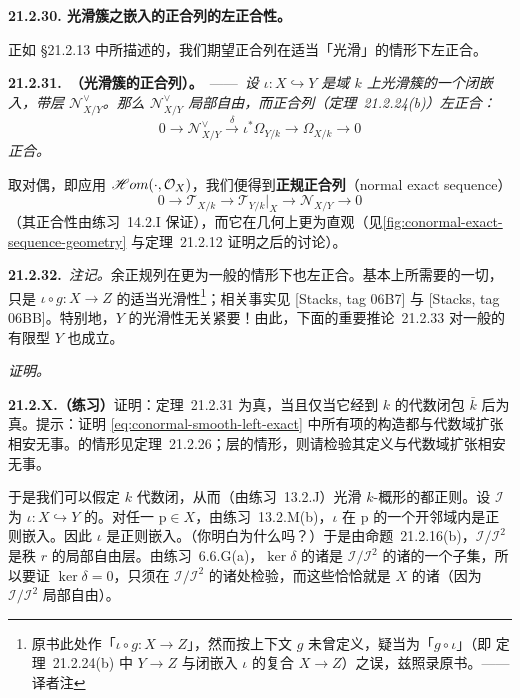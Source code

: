 \textbf{21.2.30. 光滑簇之嵌入的\trConormal{}正合列的左正合性。}

正如 \S21.2.13 中所描述的，我们期望\trConormal{}正合列在适当「光滑」的情形下左正合。

\textbf{21.2.31.\ \trhTheorem（光滑簇的\trConormal{}正合列）。}\ ——\ \emph{设 $\iota\colon X\hookrightarrow Y$ 是域 $k$ 上光滑簇的一个闭嵌入，带\trConormal{}层 $\mathscr{N}^{\vee}_{X/Y}$。那么 $\mathscr{N}^{\vee}_{X/Y}$ 局部自由，而\trConormal{}正合列（\mbox{定理~21.2.24(b)}）左正合：}
\begin{equation*}\tag{21.2.31.1}\label{eq:conormal-smooth-left-exact}
0\longrightarrow\mathscr{N}^{\vee}_{X/Y}\xrightarrow{\ \delta\ }\iota^*\Omega_{Y/k}\longrightarrow\Omega_{X/k}\longrightarrow 0
\end{equation*}
\emph{正合。}

取对偶，即应用 $\mathscr{H}om(\cdot,\mathcal{O}_X)$，我们便得到\textbf{正规正合列}（normal exact sequence）
\[
0\longrightarrow\mathscr{T}_{X/k}\longrightarrow\mathscr{T}_{Y/k}|_X\longrightarrow\mathscr{N}_{X/Y}\longrightarrow 0
\]
（其正合性由\mbox{练习~14.2.I} 保证），而它在几何上更为直观（见\cref{fig:conormal-exact-sequence-geometry} 与\mbox{定理~21.2.12} 证明之后的讨论）。

\textbf{21.2.32.}\ \emph{注记。}\quad 余正规列在更为一般的情形下也左正合。基本上所需要的一切，只是 $\iota\circ g\colon X\to Z$ 的适当光滑性\footnote{原书此处作「$\iota\circ g\colon X\to Z$」，然而按上下文 $g$ 未曾定义，疑当为「$g\circ\iota$」（即 \mbox{定理~21.2.24(b)} 中 $Y\to Z$ 与闭嵌入 $\iota$ 的复合 $X\to Z$）之误，兹照录原书。——译者注}；相关事实见 [Stacks, tag 06B7] 与 [Stacks, tag 06BB]。特别地，$Y$ 的光滑性无关紧要！由此，下面的\mbox{重要推论~21.2.33} 对一般的有限型 $Y$ 也成立。

\emph{证明。}

\textbf{21.2.X.（练习）}\quad 证明：\mbox{定理~21.2.31} 为真，当且仅当它经\trBaseChange{}到 $k$ 的代数闭包 $\bar{k}$ 后为真。提示：证明 \eqref{eq:conormal-smooth-left-exact} 中所有项的构造都与代数域扩张相安无事。\trDifferential{}的情形见\mbox{定理~21.2.26}；\trConormal{}层的情形，则请检验其定义与代数域扩张相安无事。

于是我们可以假定 $k$ 代数闭，从而（由\mbox{练习~13.2.J}）光滑 $k$-概形的\trClosedPoint{}都正则。设 $\mathscr{I}$ 为 $\iota\colon X\hookrightarrow Y$ 的\trIdealSheaf。对任一\trClosedPoint{} $\mathrm{p}\in X$，由\mbox{练习~13.2.M(b)}，$\iota$ 在 $\mathrm{p}$ 的一个开邻域内是正则嵌入。因此 $\iota$ 是正则嵌入。（你明白为什么吗？）于是由\mbox{命题~21.2.16(b)}，$\mathscr{I}/\mathscr{I}^2$ 是秩 $r$ 的局部自由层。由\mbox{练习~6.6.G(a)}，$\ker\delta$ 的诸\trAssociatedPoint{}是 $\mathscr{I}/\mathscr{I}^2$ 的诸\trAssociatedPoint{}的一个子集，所以要证 $\ker\delta=0$，只须在 $\mathscr{I}/\mathscr{I}^2$ 的诸\trAssociatedPoint{}处检验，而这些恰恰就是 $X$ 的诸\trAssociatedPoint（因为 $\mathscr{I}/\mathscr{I}^2$ 局部自由）。

